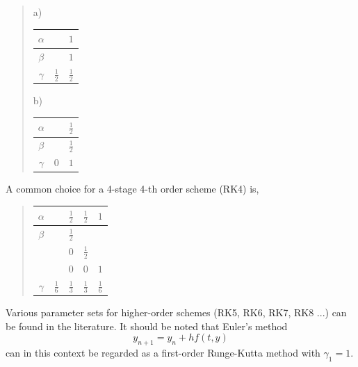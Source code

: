 \documentclass[Orbiter Technical Reference.tex]{subfiles}
\begin{document}
\begin{quote}
a) \begin{tabular}{c|cc}
$\alpha$ & & $1$ \\ \hline
$\beta$ & & $1$ \\ \hline
$\gamma$ & $\frac{1}{2}$ & $\frac{1}{2}$
\end{tabular}\qquad
b) \begin{tabular}{c|cc}
$\alpha$ & & $\frac{1}{2}$ \\ \hline
$\beta$ & & $\frac{1}{2}$ \\ \hline
$\gamma$ & $0$ & $1$
\end{tabular}
\end{quote}
A common choice for a 4-stage 4-th order scheme (RK4) is,
\begin{quote}
\begin{tabular}{c|cccc}
$\alpha$ & & $\frac{1}{2}$ & $\frac{1}{2}$ & $1$ \\ \hline
$\beta$ & & $\frac{1}{2}$ & & \\
        & & $0$ & $\frac{1}{2}$ & \\
        & & $0$ & $0$ & $1$ \\ \hline
$\gamma$ & $\frac{1}{6}$ & $\frac{1}{3}$ & $\frac{1}{3}$ & $\frac{1}{6}$
\end{tabular}
\end{quote}
Various parameter sets for higher-order schemes (RK5, RK6, RK7, RK8 ...) can be found in the literature.
It should be noted that Euler's method
\begin{equation*}
y_{n+1} = y_n + h f(t,y)
\end{equation*}
can in this context be regarded as a first-order Runge-Kutta method with $\gamma_1 = 1$.
\end{document}
